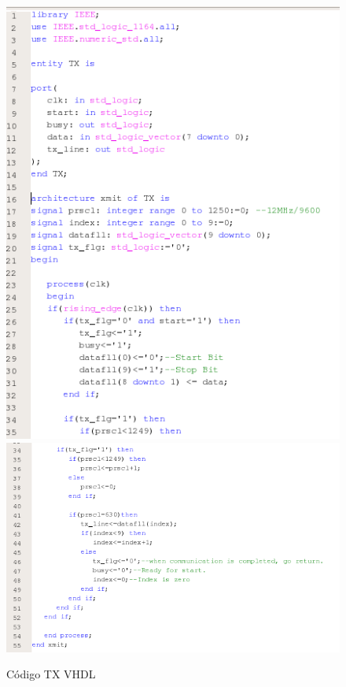 \documentclass[journal]{IEEEtran}
\begin{document}
\begin{figure}[H]
    \centering
    \includegraphics[scale=0.4]{images/tx1.png}
    \includegraphics[scale=0.4]{images/tx2.png}
    \caption{Código TX VHDL}
\end{figure}
\end{document}
